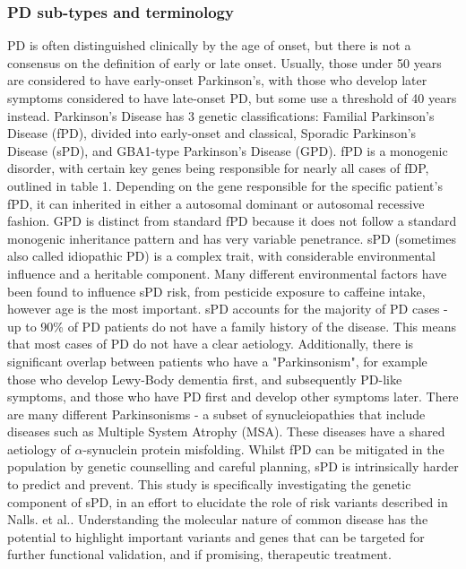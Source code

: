 \documentclass{article}
\begin{document}
\subsubsection{PD sub-types and terminology}
PD is often distinguished clinically by the age of onset, but there is not a consensus on the definition of early or late onset\cite{Riboldi2022AParkinsonism}. Usually, those under 50 years are considered to have early-onset Parkinson's, with those who develop later symptoms considered to have late-onset PD, but some use a threshold of 40 years instead\cite{Ferguson2016Early-onsetStudy}.
Parkinson's Disease has 3 genetic classifications: Familial Parkinson's Disease (fPD), divided into early-onset and classical, Sporadic Parkinson's Disease (sPD), and GBA1-type Parkinson's Disease (GPD)\cite{Tolosa2021ChallengesDisease}. fPD is a monogenic disorder, with certain key genes being responsible for nearly all cases of fDP, outlined in table 1. Depending on the gene responsible for the specific patient's fPD, it can inherited in either a autosomal dominant or autosomal recessive fashion\cite{Day2021ThePractice}. GPD is distinct from standard fPD because it does not follow a standard monogenic inheritance pattern and has very variable penetrance.
sPD (sometimes also called idiopathic PD) is a complex trait, with considerable environmental influence and a heritable component\cite{Nalls2019IdentificationStudies}. Many different environmental factors have been found to influence sPD risk\cite{Costa2023ParkinsonsDisorder}, from pesticide exposure to caffeine intake, however age is the most important. sPD accounts for the majority of PD cases - up to 90\% of PD patients do not have a family history of the disease\cite{Inamdar2007ParkinsonsBeyond}. This means that most cases of PD do not have a clear aetiology. Additionally, there is significant overlap between patients who have a "Parkinsonism", for example those who develop Lewy-Body dementia first, and subsequently PD-like symptoms\cite{Jellinger2018DementiaControversies}, and those who have PD first and develop other symptoms later.
There are many different Parkinsonisms - a subset of synucleiopathies that include diseases such as Multiple System Atrophy (MSA)\cite{Hayes2019ParkinsonsParkinsonism}. These diseases have a shared aetiology of $\alpha$-synuclein protein misfolding.
Whilst fPD can be mitigated in the population by genetic counselling and careful planning, sPD is intrinsically harder to predict and prevent. This study is specifically investigating the genetic component of sPD, in an effort to elucidate the role of risk variants described in Nalls. et al.\cite{Nalls2019IdentificationStudies}. Understanding the molecular nature of common disease has the potential to highlight important variants and genes that can be targeted for further functional validation, and if promising, therapeutic treatment.
\end{document}
